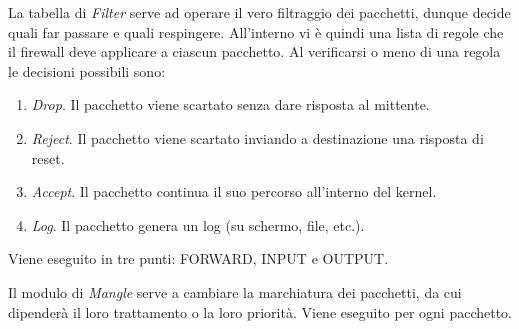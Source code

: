 La tabella di \textit{Filter} serve ad operare il vero filtraggio dei pacchetti, dunque decide quali far passare e quali respingere. All'interno vi è quindi una lista di regole che il firewall deve applicare a ciascun pacchetto. Al verificarsi o meno di una regola le decisioni possibili sono:
\begin{enumerate}
	\item \textit{Drop}. Il pacchetto viene scartato senza dare risposta al mittente.
	\item \textit{Reject}. Il pacchetto viene scartato inviando a destinazione una risposta di reset.
	\item \textit{Accept}. Il pacchetto continua il suo percorso all'interno del kernel.
	\item \textit{Log}. Il pacchetto genera un log (su schermo, file, etc.).
\end{enumerate}
Viene eseguito in tre punti: FORWARD, INPUT e OUTPUT.

Il modulo di \textit{Mangle} serve a cambiare la marchiatura dei pacchetti, da cui dipenderà il loro trattamento o la loro priorità. Viene eseguito per ogni pacchetto.

